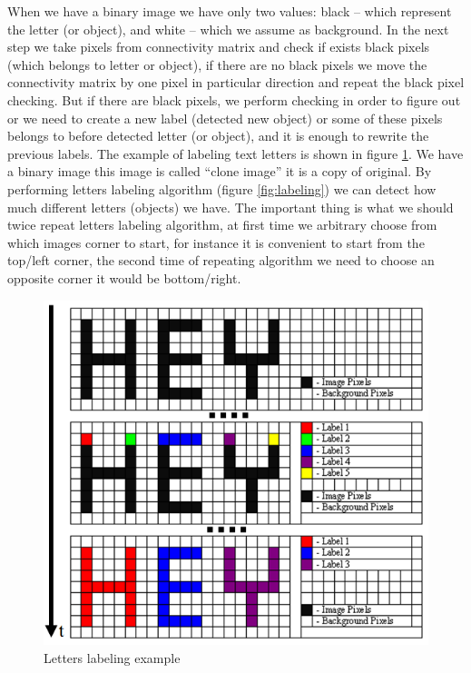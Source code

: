 When we have a binary image we have only two values: black – which represent the letter (or object), and white – which we assume as background. In the next step we take pixels from connectivity matrix and check if exists black pixels (which belongs to letter or object), if there are no black pixels we move the connectivity matrix by one pixel in particular direction and repeat the black pixel checking. But if there are black pixels, we perform checking in order to figure out or we need to create a new label (detected new object) or some of these pixels belongs to before detected letter (or object), and it is enough to rewrite the previous labels. The example of labeling text letters is shown in figure \ref{fig:labelingexample}. We have a binary image this image is called “clone image” it is a copy of original.  By performing letters labeling algorithm (figure \ref{fig:labeling}) we can detect how much different letters (objects) we have. The important thing is what we should twice repeat letters labeling algorithm, at first time we arbitrary choose from which images corner to start, for instance it  is convenient to start  from the top/left corner, the second time of repeating algorithm we need to choose an opposite corner it would be bottom/right.

\begin{figure}[H]
  \centering
  \includegraphics[scale= 0.6]{source/labelingexample.png}
  \caption{Letters labeling example}
  \label{fig:labelingexample}
\end{figure}

